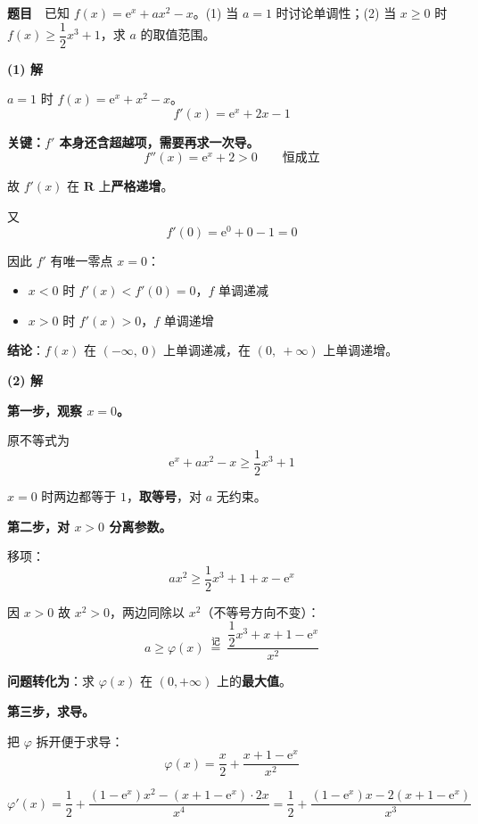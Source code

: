 \par\medskip


\textbf{题目}　已知 $f(x)=\mathrm e^{x}+ax^{2}-x$。(1) 当 $a=1$ 时讨论单调性；(2) 当 $x\ge0$ 时 $f(x)\ge\dfrac12x^{3}+1$，求 $a$ 的取值范围。

\par\medskip

\textbf{(1) 解}

$a=1$ 时 $f(x)=\mathrm e^{x}+x^{2}-x$。
\[f'(x)=\mathrm e^{x}+2x-1\]

\textbf{关键：$f'$ 本身还含超越项，需要再求一次导。}
\[f''(x)=\mathrm e^{x}+2>0\qquad\text{恒成立}\]

故 $f'(x)$ 在 $\mathbf R$ 上\textbf{严格递增}。

又
\[f'(0)=\mathrm e^{0}+0-1=0\]

因此 $f'$ 有唯一零点 $x=0$：
\begin{itemize}
\item $x<0$ 时 $f'(x)<f'(0)=0$，$f$ 单调递减
\item $x>0$ 时 $f'(x)>0$，$f$ 单调递增
\end{itemize}

\textbf{结论}：$f(x)$ 在 $(-\infty,\ 0)$ 上单调递减，在 $(0,\ +\infty)$ 上单调递增。

\par\medskip

\textbf{(2) 解}

\textbf{第一步，观察 $x=0$。}

原不等式为
\[\mathrm e^{x}+ax^{2}-x\ge\frac12x^{3}+1\]

$x=0$ 时两边都等于 $1$，\textbf{取等号}，对 $a$ 无约束。

\textbf{第二步，对 $x>0$ 分离参数。}

移项：
\[ax^{2}\ge\frac12x^{3}+1+x-\mathrm e^{x}\]

因 $x>0$ 故 $x^{2}>0$，两边同除以 $x^{2}$（不等号方向不变）：
\[a\ge\varphi(x)\ \overset{\text{记}}{=}\ \frac{\dfrac12x^{3}+x+1-\mathrm e^{x}}{x^{2}}\]

\textbf{问题转化为}：求 $\varphi(x)$ 在 $(0,+\infty)$ 上的\textbf{最大值}。

\textbf{第三步，求导。}

把 $\varphi$ 拆开便于求导：
\[\varphi(x)=\frac x2+\frac{x+1-\mathrm e^{x}}{x^{2}}\]

\[\varphi'(x)=\frac12+\frac{\left(1-\mathrm e^{x}\right)x^{2}-\left(x+1-\mathrm e^{x}\right)\cdot2x}{x^{4}}=\frac12+\frac{\left(1-\mathrm e^{x}\right)x-2\left(x+1-\mathrm e^{x}\right)}{x^{3}}\]

